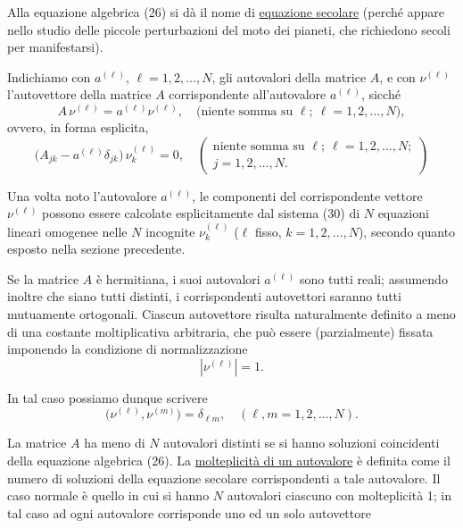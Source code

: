 \documentclass[11pt, a4paper]{book}
\numberwithin{equation}{section}
\begin{document}
Alla equazione algebrica (26) si dà il nome di \uline{equazione
secolare} (perché appare nello studio delle piccole perturbazioni del moto
dei pianeti, che richiedono secoli per manifestarsi).

Indichiamo con $a^{(\ell)}$, $\ell = 1, 2, \ldots, N$, gli autovalori
della matrice $A$, e con $\nu^{(\ell)}$ l'autovettore della matrice $A$
corrispondente all'autovalore $a^{(\ell)}$, sicché
\begin{equation}
A\,\nu^{(\ell)} = a^{(\ell)}\nu^{(\ell)},
\quad \text{(niente somma su } \ell;\ \ell=1,2,\ldots,N\text{)},
\tag{30a}
\end{equation}
ovvero, in forma esplicita,
\begin{equation}
\bigl(A_{jk} - a^{(\ell)}\delta_{jk}\bigr)\,\nu_k^{(\ell)} = 0,
\quad \begin{pmatrix}\text{niente somma su } \ell;\ \ell=1,2,\ldots,N;\\
j=1,2,\ldots,N.\end{pmatrix}
\tag{30b}
\end{equation}

Una volta noto l'autovalore $a^{(\ell)}$, le componenti del corrispondente
vettore $\nu^{(\ell)}$ possono essere calcolate esplicitamente dal sistema
(30) di $N$ equazioni lineari omogenee nelle $N$ incognite $\nu_k^{(\ell)}$
($\ell$ fisso, $k = 1,2,\ldots,N$), secondo quanto esposto nella sezione
precedente.

Se la matrice $A$ è hermitiana, i suoi autovalori $a^{(\ell)}$ sono tutti
reali; assumendo inoltre che siano tutti distinti, i corrispondenti
autovettori saranno tutti mutuamente ortogonali. Ciascun autovettore
risulta naturalmente definito a meno di una costante moltiplicativa
arbitraria, che può essere (parzialmente) fissata imponendo la condizione
di normalizzazione
\begin{equation}
\left|\nu^{(\ell)}\right| = 1.
\end{equation}

In tal caso possiamo dunque scrivere
\begin{equation}
\bigl(\nu^{(\ell)}, \nu^{(m)}\bigr) = \delta_{\ell m},
\quad (\ell, m = 1, 2, \ldots, N).
\end{equation}

La matrice $A$ ha meno di $N$ autovalori distinti se si hanno soluzioni
coincidenti della equazione algebrica (26). La \uline{molteplicità di
un autovalore} è definita come il numero di soluzioni della equazione
secolare corrispondenti a tale autovalore. Il caso normale è quello in cui
si hanno $N$ autovalori ciascuno con molteplicità 1; in tal caso ad ogni
autovalore corrisponde uno ed un solo autovettore
\end{document}
